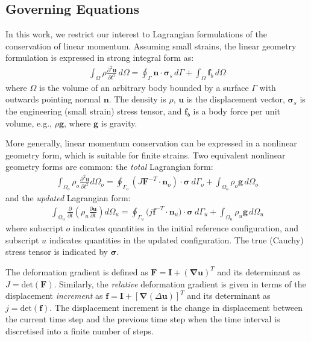 \documentclass[sn-mathphys,Numbered]{sn-jnl}%
\newcommand{\bb}{\boldsymbol}
\begin{document}
\subsection{Governing Equations} \label{sec:governing_eqn}

In this work, we restrict our interest to Lagrangian formulations of the conservation of linear momentum.
Assuming small strains, the linear geometry formulation is expressed in strong integral form as:
\begin{eqnarray} \label{eqn:momentum_lingeom}
    \int_{\Omega} \rho \frac{\partial^2 \bb{u} }{\partial t^2} \, d\Omega
    =
    \oint_{\Gamma} \bb{n} \cdot \bb{\sigma}_s \,  d\Gamma
    + \int_{\Omega}  \bb{f}_b \, d\Omega
\end{eqnarray}
where $\Omega$ is the volume of an arbitrary body bounded by a surface $\Gamma$ with outwards pointing normal $\bb{n}$.
The density is $\rho$, $\bb{u}$ is the displacement vector, $\bb{\sigma}_s$ is the engineering (small strain) stress tensor, and $\bb{f}_b$ is a body force per unit volume, e.g., $\rho \bb{g}$, where $\bb{g}$ is gravity.

More generally,  linear momentum conservation can be expressed in a nonlinear geometry form, which is suitable for finite strains.
Two equivalent nonlinear geometry forms are common: the \emph{total} Lagrangian form:
\begin{eqnarray} \label{eqn:momentum_TL}
    \int_{\Omega_o} \rho_o \frac{\partial^2 \bb{u} }{\partial t^2} d\Omega_o
    =
    \oint_{\Gamma_o} \left( J \bb{F}^{-T} \cdot \bb{n}_o \right) \cdot \bb{\sigma} \ d\Gamma_o
    + \int_{\Omega_o}  \rho_o \bb{g} \, d\Omega_o
\end{eqnarray}
and the \emph{updated} Lagrangian form:
\begin{eqnarray} \label{eqn:momentum_UL}
    \int_{\Omega_u} \frac{\partial }{\partial t} \left( \rho_u \frac{\partial \bb{u} }{\partial t} \right) d\Omega_u
    = \oint_{\Gamma_u}(j\bb{f}^{-T}\cdot{\bb{n}_u)\cdot \bb{\sigma}}\ d\Gamma_u
    + \int_{\Omega_u}  \rho_u \bb{g} \, d\Omega_u
\end{eqnarray}
where subscript $o$ indicates quantities in the initial reference configuration, and subscript $u$ indicates quantities in the updated configuration.
The true (Cauchy) stress tensor is indicated by $\bb{\sigma}$.

The deformation gradient is defined as $\bb{F} = \textbf{I} + (\bb{\nabla} \bb{u})^T$ and its determinant as $J = \text{det}(\bb{F})$.
Similarly, the \emph{relative} deformation gradient is given in terms of the displacement \emph{increment} as $\bb{f}=\textbf{I} + \left[\bb{\nabla}(\Delta \bb{u}) \right]^T$ and its determinant as $j = \text{det}(\bb{f})$.
The displacement increment is the change in displacement between the current time step and the previous time step when the time interval is discretised into a finite number of steps.
\end{document}
